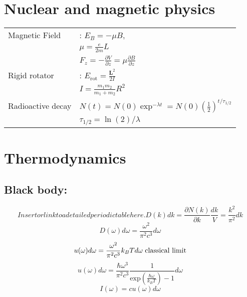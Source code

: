 \documentclass[12pt,a4paper]{article}
\begin{document}
	
	\section*{Nuclear and magnetic physics}
	\begin{tabular}{ll}
		{Magnetic Field} & : \(E_B = - \mu B \), \\
		& \( \mu = \frac{e}{2m} L\)\\
		& \( F_z = - \frac{\partial V}{\partial z} = \mu \frac{\partial B}{\partial z}  \)\\
		{Rigid rotator} & : \(E_\text{rot} = \frac{\textbf{L}^2}{2I}\) \\
		& \( I = \frac{m_1 m_2 }{m_1 + m_2} R^2 \) \\
		{Radioactive decay} & \( N(t) = N(0) \exp ^ {-\lambda t} = N(0) (\frac{1}{2})^{t/\tau _{1/2}}\)\\
		& \( \tau _{1/2} = \ln (2) / \lambda\)\\
	\end{tabular}
	
	\section*{Thermodynamics}
	\subsection*{Black body:}
	\begin{equation*}	Insert or link to a detailed periodic table here.
		D(k) dk = \frac{\partial N(k)}{\partial k} \frac{dk}{V} = \frac{k^2}{\pi^2} dk
	\end{equation*}
	\begin{equation*}
		D(\omega) d\omega = \frac{\omega^2}{\pi^2 c^3} d\omega
	\end{equation*}
	\begin{equation*}
		u(\omega) d\omega = \frac{\omega^2}{\pi^2 c^3} k_B T d\omega \hspace*{3pt}\text{classical limit}
	\end{equation*}
		\begin{equation*}
		u(\omega) d\omega = \frac{\hbar \omega^3}{\pi^2 c^3} \frac{1}{\text{exp}(\frac{\hbar \omega}{k_B T})-1} d\omega
	\end{equation*}
	\begin{equation*}
		I(\omega) = c u(\omega) d\omega
	\end{equation*}
	
	
	
\end{document}
